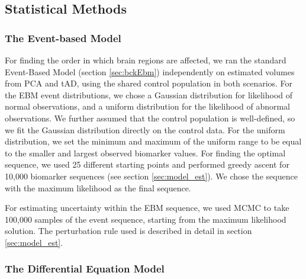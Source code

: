 \subsection{Statistical Methods}
\label{sec:pcaStaMet}

\subsubsection{The Event-based Model}
\label{sec:pcaStaMetEBM}
For finding the order in which brain regions are affected, we ran the standard Event-Based Model \cite{fonteijn2012event} (section \ref{sec:bckEbm}) independently on estimated volumes from PCA and tAD, using the shared control population in both scenarios. For the EBM event distributions, we chose a Gaussian distribution for likelihood of normal observations, and a uniform distribution for the likelihood of abnormal observations. We further assumed that the control population is well-defined, so we fit the Gaussian distribution directly on the control data. For the uniform distribution, we set the minimum and maximum of the uniform range to be equal to the smaller and largest observed biomarker values. For finding the optimal sequence, we used 25 different starting points and performed greedy ascent for 10,000 biomarker sequences (see section \ref{sec:model_est}). We chose the sequence with the maximum likelihood as the final sequence.

For estimating uncertainty within the EBM sequence, we used MCMC to take 100,000 samples of the event sequence, starting from the maximum likelihood solution. The perturbation rule used is described in detail in section \ref{sec:model_est}. 

\subsubsection{The Differential Equation Model}
\label{sec:pcaStaMetDEM}

\newcommand{\figScale}{0.5}

